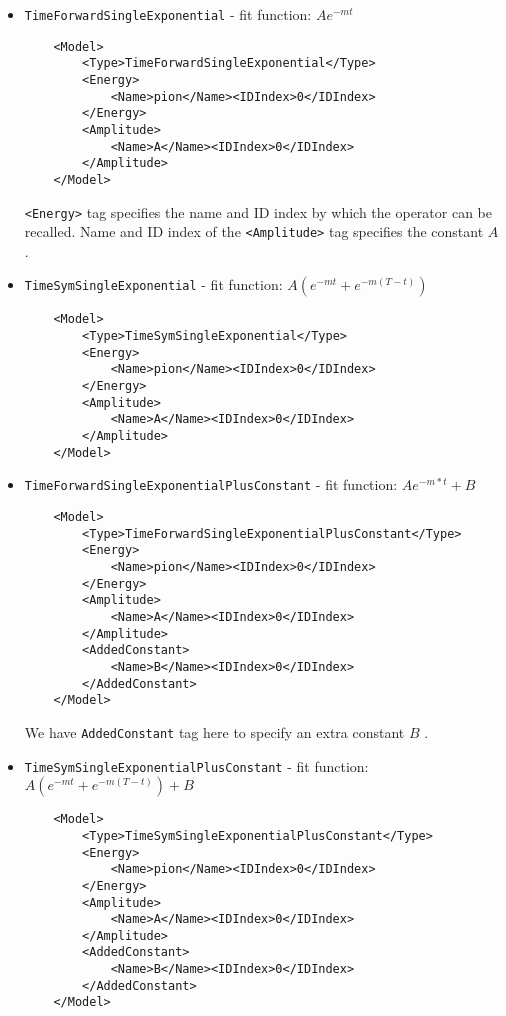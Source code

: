 \documentclass[12pt]{article}
\newcommand{\vb}{\texttt}
\begin{document}
\begin{itemize}
\item \vb{TimeForwardSingleExponential} - fit function: $A e^{-mt}$
\begin{verbatim}
    <Model>
        <Type>TimeForwardSingleExponential</Type>
        <Energy>
            <Name>pion</Name><IDIndex>0</IDIndex>
        </Energy>
        <Amplitude>
            <Name>A</Name><IDIndex>0</IDIndex>
        </Amplitude>
    </Model>
\end{verbatim} 
\vb{<Energy>} tag specifies the name and ID index by which the operator can be recalled.
Name and ID index of the \vb{<Amplitude>} tag specifies the constant $A$ .

\item \vb{TimeSymSingleExponential} - fit function: $A(e^{-mt} + e^{-m(T-t)})$
\begin{verbatim}
    <Model>
        <Type>TimeSymSingleExponential</Type>
        <Energy>
            <Name>pion</Name><IDIndex>0</IDIndex>
        </Energy>
        <Amplitude>
            <Name>A</Name><IDIndex>0</IDIndex>
        </Amplitude>
    </Model>
\end{verbatim}

\item \vb{TimeForwardSingleExponentialPlusConstant} - fit function: $A e^{-m*t} + B$
\begin{verbatim}
    <Model>
        <Type>TimeForwardSingleExponentialPlusConstant</Type>
        <Energy>
            <Name>pion</Name><IDIndex>0</IDIndex>
        </Energy>
        <Amplitude>
            <Name>A</Name><IDIndex>0</IDIndex>
        </Amplitude>
        <AddedConstant>
            <Name>B</Name><IDIndex>0</IDIndex>
        </AddedConstant>
    </Model>
\end{verbatim}

We have \vb{AddedConstant} tag here to specify an extra constant $B$ .

\item \vb{TimeSymSingleExponentialPlusConstant} - fit function: $A(e^{-mt} + e^{-m(T-t)} ) + B$
\begin{verbatim}
    <Model>
        <Type>TimeSymSingleExponentialPlusConstant</Type>
        <Energy>
            <Name>pion</Name><IDIndex>0</IDIndex>
        </Energy>
        <Amplitude>
            <Name>A</Name><IDIndex>0</IDIndex>
        </Amplitude>
        <AddedConstant>
            <Name>B</Name><IDIndex>0</IDIndex>
        </AddedConstant>
    </Model>
\end{verbatim}


\end{itemize}
\end{document}
